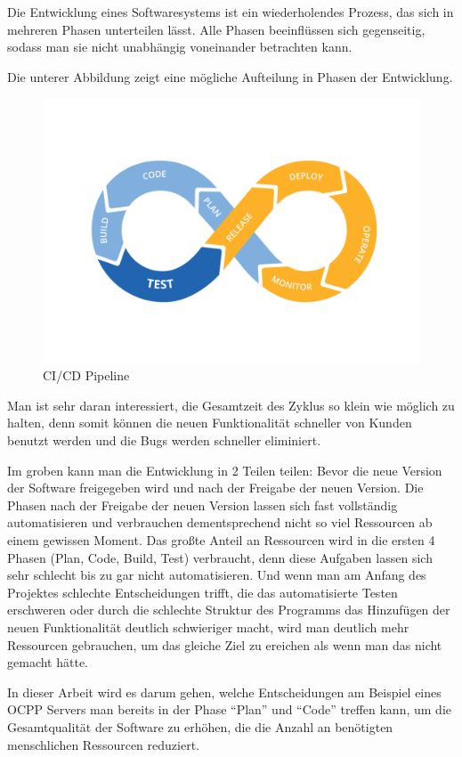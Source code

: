 Die Entwicklung eines Softwaresystems ist ein wiederholendes Prozess, das sich in mehreren Phasen unterteilen lässt.
Alle Phasen beeinflüssen sich gegenseitig, sodass man sie nicht unabhängig voneinander betrachten kann. 

Die unterer Abbildung zeigt eine mögliche Aufteilung in Phasen der Entwicklung. 
\begin{figure}[H]
    \centering
    \includegraphics[width=1\textwidth]{../images/CiCD.png}
    \caption{CI/CD Pipeline}
    \label{fig:flow around cylinder}
\end{figure}

Man ist sehr daran interessiert, die Gesamtzeit des Zyklus so klein wie möglich zu halten, denn somit können die neuen Funktionalität schneller von Kunden benutzt werden und 
die Bugs werden schneller eliminiert. 

Im groben kann man die Entwicklung in 2 Teilen teilen: Bevor die neue Version der Software freigegeben wird und nach der Freigabe der neuen Version.
Die Phasen nach der Freigabe der neuen Version lassen sich fast vollständig automatisieren 
und verbrauchen dementsprechend nicht so viel Ressourcen ab einem gewissen Moment. Das großte Anteil an Ressourcen wird in die ersten 4 Phasen (Plan, Code, Build, Test) verbraucht, 
denn diese Aufgaben lassen sich sehr schlecht bis zu gar nicht automatisieren. 
Und wenn man am Anfang des Projektes schlechte Entscheidungen trifft, 
die das automatisierte Testen erschweren oder durch die schlechte Struktur des Programms das Hinzufügen der neuen Funktionalität deutlich schwieriger macht, 
wird man deutlich mehr Ressourcen gebrauchen, um das gleiche Ziel zu ereichen als wenn man das nicht gemacht hätte.

In dieser Arbeit wird es darum gehen, welche Entscheidungen am Beispiel eines OCPP Servers man bereits in der Phase ``Plan'' und ``Code'' treffen kann, 
um die Gesamtqualität der Software zu erhöhen, die die Anzahl an benötigten menschlichen Ressourcen reduziert. 